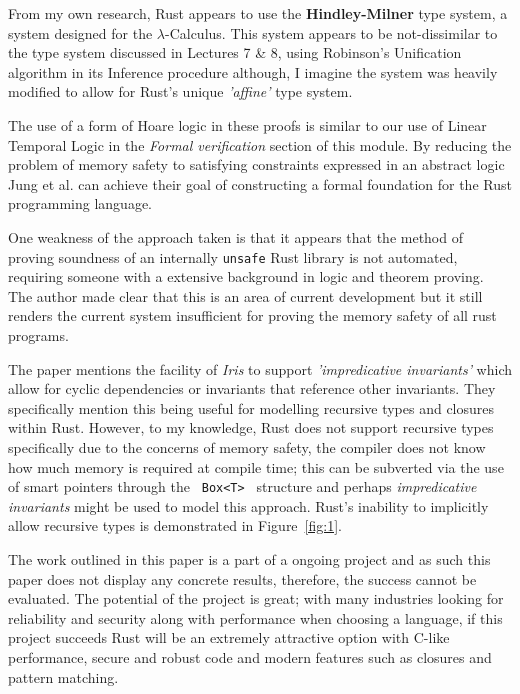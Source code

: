 \documentclass[11pt]{article}
\begin{document}
From my own research, Rust appears to use the \textbf{Hindley-Milner} type system, a system designed for the $\lambda$-Calculus. This system appears to be not-dissimilar to the type system discussed in Lectures 7 \& 8, using Robinson's Unification algorithm in its Inference procedure although, I imagine the system was heavily modified to allow for Rust's unique \textit{'affine'} type system.

The use of a form of Hoare logic in these proofs is similar to our use of Linear Temporal Logic in the \textit{Formal verification} section of this module. By reducing the problem of memory safety to satisfying constraints expressed in an abstract logic Jung et al. can achieve their goal of constructing a formal foundation for the Rust programming language.

One weakness of the approach taken is that it appears that the method of proving soundness of an internally \texttt{unsafe} Rust library is not automated, requiring someone with a extensive background in logic and theorem proving. The author made clear that this is an area of current development but it still renders the current system insufficient for proving the memory safety of all rust programs.

The paper mentions the facility of \textit{Iris} to support \textit{'impredicative invariants'} which allow for cyclic dependencies or invariants that reference other invariants. They specifically mention this being useful for modelling recursive types and closures within Rust. However, to my knowledge, Rust does not support recursive types specifically due to the concerns of memory safety, the compiler does not know how much memory is required at compile time; this can be subverted via the use of smart pointers through the \texttt{ Box<T> } structure and perhaps \textit{impredicative invariants} might be used to model this approach. Rust's inability to implicitly allow recursive types is demonstrated in Figure~\ref{fig:1}.   

The work outlined in this paper is a part of a ongoing project and as such this paper does not display any concrete results, therefore, the success cannot be evaluated. The potential of the project is great; with many industries looking for reliability and security along with performance when choosing a language, if this project succeeds Rust will be an extremely attractive option with C-like performance, secure and robust code and modern features such as closures and pattern matching.
\end{document}
